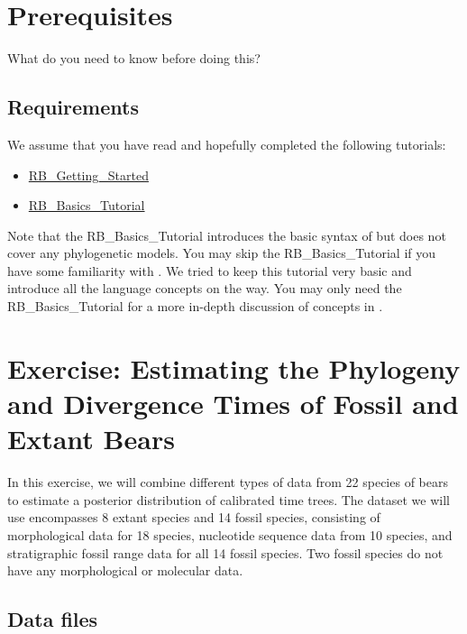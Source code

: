 \section{Prerequisites}

What do you need to know before doing this?

\subsection{Requirements}
We assume that you have read and hopefully completed the following tutorials:
\begin{itemize}
\item \href{https://github.com/revbayes/revbayes_tutorial/raw/master/tutorial_TeX/RB_Getting_Started/RB_Getting_Started.pdf}{RB\_Getting\_Started}
\item \href{https://github.com/revbayes/revbayes_tutorial/raw/master/tutorial_TeX/RB_Basics_Tutorial/RB_Basics_Tutorial.pdf}{RB\_Basics\_Tutorial}
\end{itemize}
Note that the RB\_Basics\_Tutorial introduces the basic syntax of \Rev but does not cover any phylogenetic models.
You may skip the RB\_Basics\_Tutorial if you have some familiarity with \R.
We tried to keep this tutorial very basic and introduce all the language concepts on the way.
You may only need the RB\_Basics\_Tutorial for a more in-depth discussion of concepts in \Rev.




\section{Exercise: Estimating the Phylogeny and Divergence Times of Fossil and Extant Bears}\label{sect:RB-ExerciseMain}

In this exercise, we will combine different types of data from 22 species of bears to estimate a posterior distribution of calibrated time trees.
The dataset we will use encompasses 8 extant species and 14 fossil species, consisting of morphological data for 18 species, nucleotide sequence data from 10 species, and stratigraphic fossil range data for all 14 fossil species.
Two fossil species do not have any morphological or molecular data.

\subsection{Data files}\label{subsect:RB-DataFiles}

